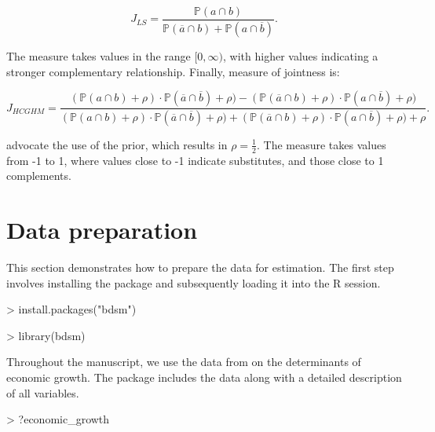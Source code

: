 \documentclass[a4paper]{article}
\begin{document}
\begin{equation}
    J_{LS}=\frac{\mathbb{P}(a\cap b)}{\mathbb{P}(\overline{a}\cap b)+\mathbb{P}(a\cap \overline{b})}.
\end{equation}

The measure takes values in the range $[0, \infty)$, with higher values indicating a stronger complementary relationship.
Finally, \citet{Hofmarcher+2018} measure of jointness is:

\begin{equation}
    J_{HCGHM}=\frac{(\mathbb{P}(a\cap b)+\rho) \cdot \mathbb{P}(\overline{a}\cap \overline{b})+\rho)-(\mathbb{P}(\overline{a}\cap b)+\rho) \cdot \mathbb{P}(a\cap \overline{b})+\rho)}{(\mathbb{P}(a\cap b)+\rho) \cdot \mathbb{P}(\overline{a}\cap \overline{b})+\rho)+(\mathbb{P}(\overline{a}\cap b)+\rho) \cdot \mathbb{P}(a\cap \overline{b})+\rho)+\rho}.
\end{equation}

\citet{Hofmarcher+2018} advocate the use of the \citet{Jeffreys+1946} prior, which results in $\rho=\frac{1}{2}$.
The measure takes values from -1 to 1, where values close to -1 indicate substitutes, and those close to 1 complements.

\section{Data preparation}\label{data}

This section demonstrates how to prepare the data for estimation.
The first step involves installing the package and subsequently loading it into the R session.

\begin{Schunk}
\begin{Sinput}
> install.packages("bdsm")
\end{Sinput}
\end{Schunk}

\begin{Schunk}
\begin{Sinput}
> library(bdsm)
\end{Sinput}
\end{Schunk}

Throughout the manuscript, we use the data from \citet{Moral+2016} on the determinants of economic growth.
The package includes the data along with a detailed description of all variables.
\begin{Schunk}
\begin{Sinput}
> ?economic_growth
\end{Sinput}
\end{Schunk}
\end{document}
